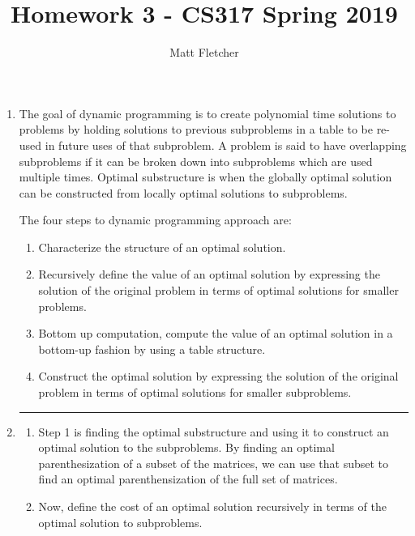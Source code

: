 \documentclass{article}
\title{Homework 3 - CS317 Spring 2019}
\author{Matt Fletcher}
\begin{document}
\maketitle

\begin{enumerate}

\item The goal of dynamic programming is to create polynomial time solutions to problems by holding solutions to previous subproblems in a table to be re-used in future uses of that subproblem. A problem is said to have overlapping subproblems if it can be broken down into subproblems which are used multiple times. Optimal substructure is when the globally optimal solution can be constructed from locally optimal solutions to subproblems.
    
    The four steps to dynamic programming approach are:

\begin{enumerate}
	\item Characterize the structure of an optimal solution. 
	
	\item Recursively define the value of an optimal solution by expressing the solution of the original problem in terms of optimal solutions for smaller problems. 

	\item Bottom up computation, compute the value of an optimal solution in a bottom-up fashion by using a table structure. 

	\item Construct the optimal solution by expressing the solution of the original problem in terms of optimal solutions for smaller subproblems. 
	 
\end{enumerate}

\noindent\rule{8cm}{0.4pt}

\item  
    \begin{enumerate}
        \item Step 1 is finding the optimal substructure and using it to construct an optimal solution to the subproblems. By finding an optimal parenthesization of a subset of the matrices, we can use that subset to find an optimal parenthensization of the full set of matrices. 

        \item Now, define the cost of an optimal solution recursively in terms of the optimal solution to subproblems. 


\end{enumerate}
\end{enumerate}
\end{document}
